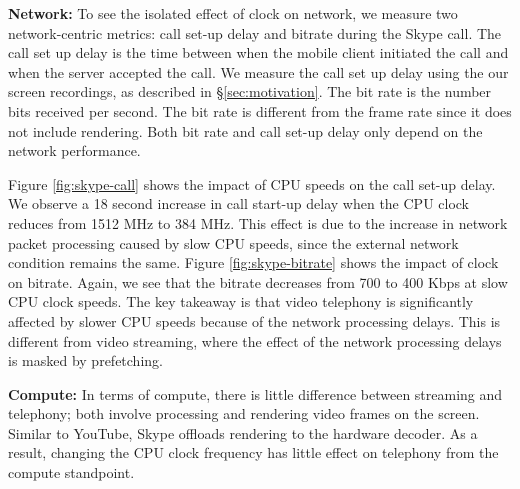 
\noindent \textbf{Network:} 
To see the isolated effect of clock on network, we measure two network-centric metrics: call set-up delay and bitrate during the Skype call. 
The call set up delay is the time between when the mobile client initiated the call and when the server accepted the call. We measure the call set up delay using the our screen recordings, as described in \S\ref{sec:motivation}. The bit rate is the number bits received per second. The bit rate is different from the frame rate since it does not include rendering. Both bit rate and call set-up delay only depend on the network performance.



Figure \ref{fig:skype-call} shows the impact of CPU speeds on the call set-up delay.
We observe a 18 second increase in call start-up delay when the CPU clock reduces from 1512 MHz to 384 MHz. This effect is due to the increase in network packet processing caused by slow CPU speeds, since the external network condition remains the same. Figure \ref{fig:skype-bitrate} shows the impact of clock on bitrate. 
Again, we see that the bitrate decreases from 700 to 400 Kbps at slow CPU clock speeds. The key takeaway is that video telephony is significantly affected by slower CPU speeds because of the network processing delays. This is different from video streaming, where the effect of the network processing delays is masked by prefetching.








\noindent \textbf{Compute:} In terms of compute, there is little difference between streaming and telephony; both involve processing and rendering video frames on the screen. Similar to YouTube, Skype offloads rendering to the hardware decoder. As a result, changing the CPU clock frequency has little effect on telephony from the compute standpoint.
